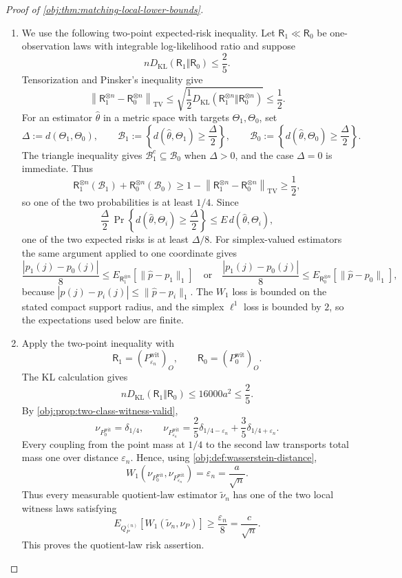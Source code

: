 \begin{proof}[Proof of \cref{obj:thm:matching-local-lower-bounds}]
\begin{enumerate}
\item We use the following two-point expected-risk inequality.  Let \(\mathsf R_1\ll\mathsf R_0\) be one-observation laws with integrable log-likelihood ratio and suppose
\[
nD_{\mathrm{KL}}(\mathsf R_1\Vert\mathsf R_0)\le\frac25 .
\]
Tensorization and Pinsker's inequality give
\[
\left\|\mathsf R_1^{\otimes n}-\mathsf R_0^{\otimes n}\right\|_{\mathrm{TV}}
\le
\sqrt{\frac12D_{\mathrm{KL}}(\mathsf R_1^{\otimes n}\Vert\mathsf R_0^{\otimes n})}
\le\frac12 .
\]
For an estimator \(\widehat\theta\) in a metric space with targets \(\Theta_1,\Theta_0\), set
\[
\Delta:=d(\Theta_1,\Theta_0),
\qquad
\mathcal B_1:=\left\{d(\widehat\theta,\Theta_1)\ge\frac{\Delta}{2}\right\},
\qquad
\mathcal B_0:=\left\{d(\widehat\theta,\Theta_0)\ge\frac{\Delta}{2}\right\}.
\]
The triangle inequality gives \(\mathcal B_1^{c}\subseteq\mathcal B_0\) when \(\Delta>0\), and the case \(\Delta=0\) is immediate.  Thus
\[
\mathsf R_1^{\otimes n}(\mathcal B_1)+\mathsf R_0^{\otimes n}(\mathcal B_0)
\ge
1-\left\|\mathsf R_1^{\otimes n}-\mathsf R_0^{\otimes n}\right\|_{\mathrm{TV}}
\ge\frac12,
\]
so one of the two probabilities is at least \(1/4\).  Since
\[
\frac{\Delta}{2}\,\Pr\!\left\{d(\widehat\theta,\Theta_i)\ge\frac{\Delta}{2}\right\}
\le
E\,d(\widehat\theta,\Theta_i),
\]
one of the two expected risks is at least \(\Delta/8\).  For simplex-valued estimators the same argument applied to one coordinate gives
\[
\frac{|p_1(j)-p_0(j)|}{8}
\le
E_{\mathsf R_1^{\otimes n}}\!\left[\|\widehat p-p_1\|_1\right]
\quad\text{or}\quad
\frac{|p_1(j)-p_0(j)|}{8}
\le
E_{\mathsf R_0^{\otimes n}}\!\left[\|\widehat p-p_0\|_1\right],
\]
because \(|\widehat p(j)-p_i(j)|\le\|\widehat p-p_i\|_1\).  The \(W_1\) loss is bounded on the stated compact support radius, and the simplex \(\ell^1\) loss is bounded by \(2\), so the expectations used below are finite. %

\item Apply the two-point inequality with
\[
\mathsf R_1=(P_{\varepsilon_n}^{\mathrm{wit}})_O,
\qquad
\mathsf R_0=(P_0^{\mathrm{wit}})_O .
\]
The KL calculation gives
\[
nD_{\mathrm{KL}}(\mathsf R_1\Vert\mathsf R_0)
\le
16000a^2
\le
\frac25 .
\]
By \cref{obj:prop:two-class-witness-valid},
\[
\nu_{P_0^{\mathrm{wit}}}=\delta_{1/4},
\qquad
\nu_{P_{\varepsilon_n}^{\mathrm{wit}}}
=
\frac25\delta_{1/4-\varepsilon_n}
+
\frac35\delta_{1/4+\varepsilon_n}.
\]
Every coupling from the point mass at \(1/4\) to the second law transports total mass one over distance \(\varepsilon_n\).  Hence, using \cref{obj:def:wasserstein-distance},
\[
W_1\!\left(\nu_{P_0^{\mathrm{wit}}},\nu_{P_{\varepsilon_n}^{\mathrm{wit}}}\right)
=
\varepsilon_n
=
\frac a{\sqrt n}.
\]
Thus every measurable quotient-law estimator \(\widetilde\nu_n\) has one of the two local witness laws satisfying
\[
E_{Q_P^{(n)}}\!\left[W_1(\widetilde\nu_n,\nu_P)\right]
\ge
\frac{\varepsilon_n}{8}
=
\frac{c}{\sqrt n}.
\]
This proves the quotient-law risk assertion. %


\end{enumerate}
\end{proof}
